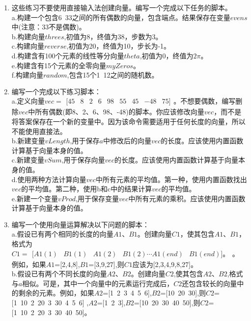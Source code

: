 \documentclass[UTF8]{ctexart}
\begin{document}
\begin{enumerate}
	\item 这些练习不要使用直接输入法创建向量。编写一个完成以下任务的脚本。\\
	a.构建一个包含6~33之间的所有偶数的向量，包含端点。结果保存在变量$evens$中(注意：33不是偶数)。\\
	b.构建向量$threes$,初值为8，终值为38，步数为3。\\
	c.构建向量$reverse$,初值为20，终值为10，步长为-1。\\
	d.构建含有100个元素的线性等分向量$theta$,初值为0，终值为$2\pi$。\\
	e.构建含有15个元素的全零向量$myZeros$。\\
	f.构建向量$random$,包含15个1~12之间的随机数。
	\item 编写一个完成以下练习脚本：\\
	a.定义向量$ vec = \begin{smallmatrix}
	[45&8&2&6&98&55&45&-48&75]
	\end{smallmatrix}$。不想要偶数，编写删除$vec$中所有偶数(即8、2、6、98、-48)的脚本。你应该修改向量$vec$，而不是将答案保存在一个新的变量中。因为该命令需要适用于任何长度的向量，所以不能使用直接法。\\
	b.新建变量$vLength$,用于保存$a$中修改后的向量$vec$的长度。应该使用内置函数计算基于向量本身的值。\\
	c.新建变量$vSum$,用于保存向量$vec$的长度。应该使用内置函数计算基于向量本身的值。\\
	d.使用两种方法计算向量$vec$中所有元素的平均值。第一种，使用内置函数找出$vec$的平均值。第二种，使用b和c中的结果计算$vec$的平均值。\\
	e.新建一个变量$vProd$,用于保存变量$vec$中所有元素的乘积。应该使用内置函数计算基于向量本身的值。
	\item 编写一个使用向量运算解决以下问题的脚本：\\
		a.假设已有两个相同的长度的向量$A1\text{、}B1$。创建向量$C1$，使其包含$A1、B1$，格式为$C1=\begin{smallmatrix}
	[A1(1)&B1(1)&A1(2)&B1(2)\cdots A1(end)&B1(end)]。
	\end{smallmatrix}$。
	例如，如果$A1$=[2,4,8],$B1$=[3,9,27],则$C1$应该为[2,3,4,9,8,27]。\\
	b.假设已有两个不同长度的向量$A2\text{、}B2$。创建向量$C2$,使其包含$A2\text{、}B2$,格式与$a$相似。可是，其中一个向量中的元素运行完成后，$C2$还包含较长的向量中的剩余的元素。例如，如果$A2$=[1\ 2\ 3\ 4\ 5\ 6],$B2$=[10\ 20\ 30],则$C2$=[1\ 10\ 2\ 20\ 3\ 30\ 4\ 5\ 6]
	,$A2$=[1\ 2\ 3],$B2$=[10\ 20\ 30\ 40\ 50],则$C2$=[1\ 10\ 2\ 20\ 3\ 30\ 40\ 50]。

\end{enumerate}
\end{document}

